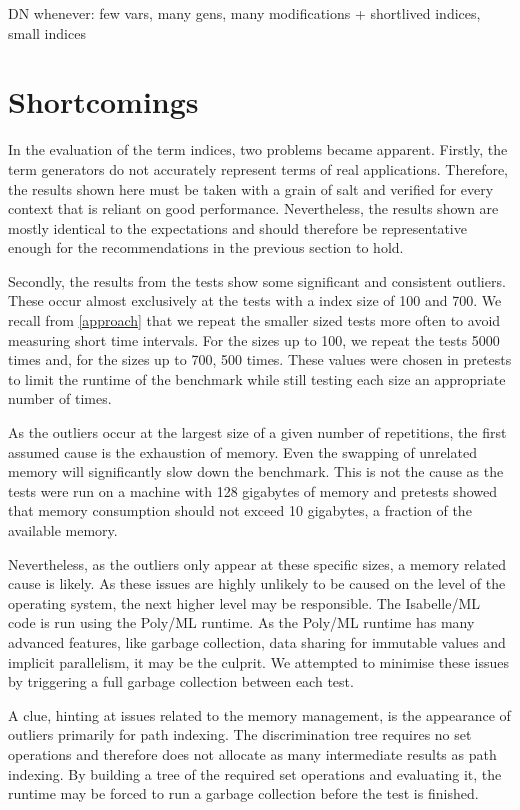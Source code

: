 DN whenever: few vars, many gens, many modifications + shortlived indices, small indices

\section{Shortcomings}
In the evaluation of the term indices, two problems became apparent. Firstly, the term generators do not accurately represent terms of real applications. Therefore, the results shown here must be taken with a grain of salt and verified for every context that is reliant on good performance. Nevertheless, the results shown are mostly identical to the expectations and should therefore be representative enough for the recommendations in the previous section to hold.

Secondly, the results from the tests show some significant and consistent outliers. These occur almost exclusively at the tests with a index size of 100 and 700. We recall from \cref{approach} that we repeat the smaller sized tests more often to avoid measuring short time intervals. For the sizes up to 100, we repeat the tests 5000 times and, for the sizes up to 700, 500 times. These values were chosen in pretests to limit the runtime of the benchmark while still testing each size an appropriate number of times.

As the outliers occur at the largest size of a given number of repetitions, the first assumed cause is the exhaustion of memory. Even the swapping of unrelated memory will significantly slow down the benchmark. This is not the cause as the tests were run on a machine with 128 gigabytes of memory and pretests showed that memory consumption should not exceed 10 gigabytes, a fraction of the available memory.

Nevertheless, as the outliers only appear at these specific sizes, a memory related cause is likely. As these issues are highly unlikely to be caused on the level of the operating system, the next higher level may be responsible. The Isabelle/ML code is run using the Poly/ML runtime. As the Poly/ML runtime has many advanced features, like garbage collection, data sharing for immutable values and implicit parallelism, it may be the culprit. We attempted to minimise these issues by triggering a full garbage collection between each test.

A clue, hinting at issues related to the memory management, is the appearance of outliers primarily for path indexing. The discrimination tree requires no set operations and therefore does not allocate as many intermediate results as path indexing. By building a tree of the required set operations and evaluating it, the runtime may be forced to run a garbage collection before the test is finished.

